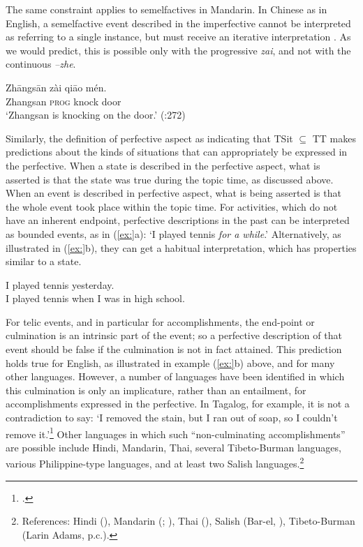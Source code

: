 The same constraint applies to semelfactives in Mandarin. In Chinese as in English, a semelfactive event described in the imperfective cannot be interpreted as referring to a single instance, but must receive an iterative interpretation . As we would predict, this is possible only with the progressive \textit{zai}, and not with the continuous \textit{–zhe}.


\ea
\gll Zh\=angs\=an  zài  qi\=ao  mén.\\
Zhangsan  \textsc{prog}  knock  door\\
\glt ‘Zhangsan is knocking on the door.’  (\citealt{Smith1997}:272)
\z


Similarly, the definition of perfective aspect as indicating that TSit ${\subseteq}$ TT makes predictions about the kinds of situations that can appropriately be expressed in the perfective. When a state is described in the perfective aspect, what is asserted is that the state was true during the topic time, as discussed above. When an event is described in perfective aspect, what is being asserted is that the whole event took place within the topic time. For activities, which do not have an inherent endpoint, perfective descriptions in the past can be interpreted as bounded events, as in (\ref{ex:}a): ‘I played tennis \textit{for a while}.’ Alternatively, as illustrated in (\ref{ex:}b), they can get a habitual interpretation, which has properties similar to a state.


\ea
\ea I played tennis yesterday.\\
\ex I played tennis when I was in high school.
                       \z
\z


For telic events, and in particular for accomplishments, the end-point or culmination is an intrinsic part of the event; so a perfective description of that event should be false if the culmination is not in fact attained. This prediction holds true for English, as illustrated in example (\ref{ex:}b) above, and for many other languages. However, a number of languages have been identified in which this culmination is only an implicature, rather than an entailment, for accomplishments expressed in the perfective. In Tagalog, for example, it is not a contradiction to say: ‘I removed the stain, but I ran out of soap, so I couldn’t remove it.’\footnote{\citet[186]{Dell1983}.} Other languages in which such “non-culminating accomplishments” are possible include Hindi, Mandarin, Thai, several Tibeto-Burman languages, various Philippine-type languages, and at least two Salish languages.\footnote{References: Hindi (\citealt{Singh1991,Singh1998}), Mandarin (\citealt{SohKuo2005}; \citealt{KoenigChief2008}), Thai (\citealt{KoenigMuansuwan2000}), Salish (Bar-el, \citealt{DavisMatthewson2005}), Tibeto-Burman (Larin Adams, p.c.).}



